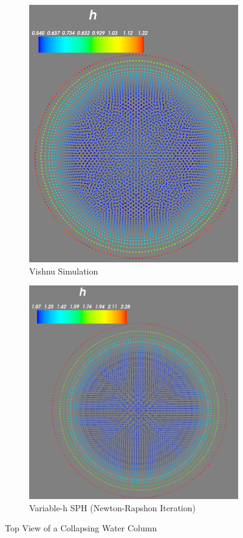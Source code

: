 \documentclass{article}
\begin{document}
\begin{figure}[!htbp]
\centering
\begin{subfigure}{.5\textwidth}
  \centering
  \includegraphics[width=0.85\linewidth]{vishnu_varh_circ_dam_break.png}
  \caption{Vishnu Simulation}
  \label{fig:sub11}
\end{subfigure}%
\begin{subfigure}{.5\textwidth}
  \centering
  \includegraphics[width=1.0\linewidth]{My_varh_circ_dam_break.png}
  \caption{Variable-h SPH (Newton-Rapshon Iteration)}
  \label{fig:sub21}
\end{subfigure}
\caption{Top View of a Collapsing Water Column}
\label{fig:collapse}
\end{figure}
\newpage
\end{document}
